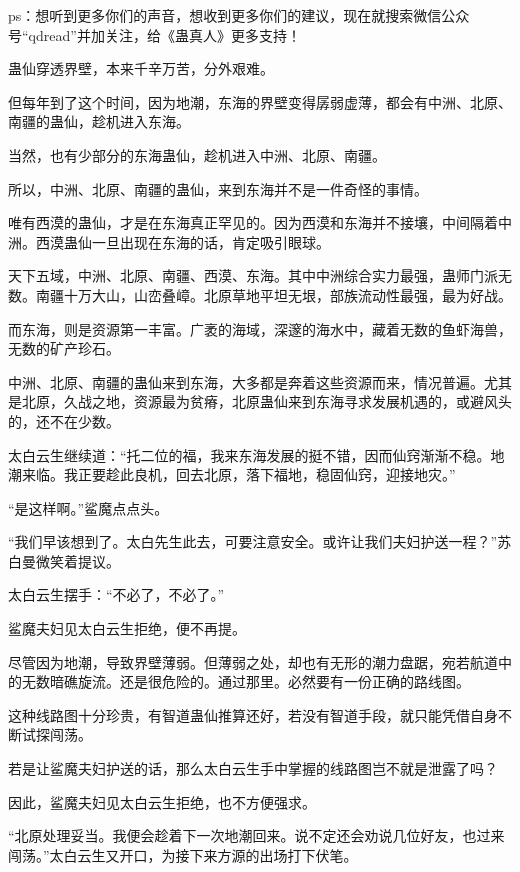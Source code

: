
\begin{this_body}

ps：想听到更多你们的声音，想收到更多你们的建议，现在就搜索微信公众号“qdread”并加关注，给《蛊真人》更多支持！

蛊仙穿透界壁，本来千辛万苦，分外艰难。

但每年到了这个时间，因为地潮，东海的界壁变得孱弱虚薄，都会有中洲、北原、南疆的蛊仙，趁机进入东海。

当然，也有少部分的东海蛊仙，趁机进入中洲、北原、南疆。

所以，中洲、北原、南疆的蛊仙，来到东海并不是一件奇怪的事情。

唯有西漠的蛊仙，才是在东海真正罕见的。因为西漠和东海并不接壤，中间隔着中洲。西漠蛊仙一旦出现在东海的话，肯定吸引眼球。

天下五域，中洲、北原、南疆、西漠、东海。其中中洲综合实力最强，蛊师门派无数。南疆十万大山，山峦叠嶂。北原草地平坦无垠，部族流动性最强，最为好战。

而东海，则是资源第一丰富。广袤的海域，深邃的海水中，藏着无数的鱼虾海兽，无数的矿产珍石。

中洲、北原、南疆的蛊仙来到东海，大多都是奔着这些资源而来，情况普遍。尤其是北原，久战之地，资源最为贫瘠，北原蛊仙来到东海寻求发展机遇的，或避风头的，还不在少数。

太白云生继续道：“托二位的福，我来东海发展的挺不错，因而仙窍渐渐不稳。地潮来临。我正要趁此良机，回去北原，落下福地，稳固仙窍，迎接地灾。”

“是这样啊。”鲨魔点点头。

“我们早该想到了。太白先生此去，可要注意安全。或许让我们夫妇护送一程？”苏白曼微笑着提议。

太白云生摆手：“不必了，不必了。”

鲨魔夫妇见太白云生拒绝，便不再提。

尽管因为地潮，导致界壁薄弱。但薄弱之处，却也有无形的潮力盘踞，宛若航道中的无数暗礁旋流。还是很危险的。通过那里。必然要有一份正确的路线图。

这种线路图十分珍贵，有智道蛊仙推算还好，若没有智道手段，就只能凭借自身不断试探闯荡。

若是让鲨魔夫妇护送的话，那么太白云生手中掌握的线路图岂不就是泄露了吗？

因此，鲨魔夫妇见太白云生拒绝，也不方便强求。

“北原处理妥当。我便会趁着下一次地潮回来。说不定还会劝说几位好友，也过来闯荡。”太白云生又开口，为接下来方源的出场打下伏笔。


\end{this_body}
